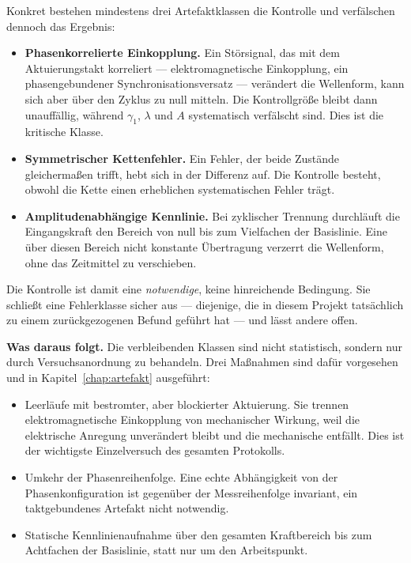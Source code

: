 \documentclass[12pt,a4paper]{report}
\begin{document}
Konkret bestehen mindestens drei Artefaktklassen die Kontrolle und
verfälschen dennoch das Ergebnis:

\begin{itemize}
    \item \textbf{Phasenkorrelierte Einkopplung.} Ein Störsignal, das
    mit dem Aktuierungstakt korreliert --- elektromagnetische
    Einkopplung, ein phasengebundener Synchronisationsversatz ---
    verändert die Wellenform, kann sich aber über den Zyklus zu null
    mitteln. Die Kontrollgröße bleibt dann unauffällig, während
    $\gamma_1$, $\lambda$ und $A$ systematisch verfälscht sind. Dies ist
    die kritische Klasse.
    \item \textbf{Symmetrischer Kettenfehler.} Ein Fehler, der beide
    Zustände gleichermaßen trifft, hebt sich in der Differenz auf. Die
    Kontrolle besteht, obwohl die Kette einen erheblichen systematischen
    Fehler trägt.
    \item \textbf{Amplitudenabhängige Kennlinie.} Bei zyklischer
    Trennung durchläuft die Eingangskraft den Bereich von null bis zum
    Vielfachen der Basislinie. Eine über diesen Bereich nicht konstante
    Übertragung verzerrt die Wellenform, ohne das Zeitmittel zu
    verschieben.
\end{itemize}

Die Kontrolle ist damit eine \emph{notwendige}, keine hinreichende
Bedingung. Sie schließt eine Fehlerklasse sicher aus --- diejenige, die
in diesem Projekt tatsächlich zu einem zurückgezogenen Befund geführt hat
--- und lässt andere offen.

\vspace{0.5em}

\textbf{Was daraus folgt.} Die verbleibenden Klassen sind nicht
statistisch, sondern nur durch Versuchsanordnung zu behandeln. Drei
Maßnahmen sind dafür vorgesehen und in Kapitel~\ref{chap:artefakt}
ausgeführt:

\begin{itemize}
    \item Leerläufe mit bestromter, aber blockierter Aktuierung. Sie
    trennen elektromagnetische Einkopplung von mechanischer Wirkung,
    weil die elektrische Anregung unverändert bleibt und die mechanische
    entfällt. Dies ist der wichtigste Einzelversuch des gesamten
    Protokolls.
    \item Umkehr der Phasenreihenfolge. Eine echte Abhängigkeit von der
    Phasenkonfiguration ist gegenüber der Messreihenfolge invariant, ein
    taktgebundenes Artefakt nicht notwendig.
    \item Statische Kennlinienaufnahme über den gesamten Kraftbereich
    bis zum Achtfachen der Basislinie, statt nur um den Arbeitspunkt.
\end{itemize}
\end{document}
